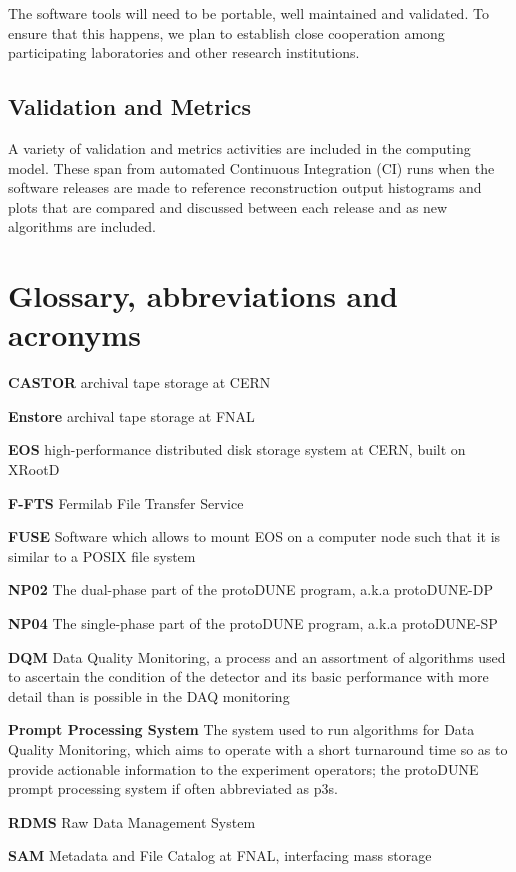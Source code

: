 \documentclass[12pt]{article}
\newcommand{\pd}{protoDUNE\xspace}
\begin{document}
The software tools will need to be portable, well maintained and validated. To ensure that this happens,
we plan to establish close cooperation among participating laboratories and other research institutions.

\subsection{Validation and Metrics}
A variety of validation and metrics activities are included in the computing model. These span from automated Continuous Integration (CI) runs when the software releases are made to reference reconstruction output histograms and plots that are  compared and discussed between each release and as new algorithms are included. 


\newpage
\appendix
\section{Glossary, abbreviations and acronyms}
\label{sec:appendix-glossary}


\begin{description}

\item{\textbf{CASTOR}} archival tape storage at CERN

\item{\textbf{Enstore}} archival tape storage at FNAL

\item{\textbf{EOS}}  high-performance distributed disk storage system at CERN, built on XRootD

\item{\textbf{F-FTS}} Fermilab File Transfer Service

\item{\textbf{FUSE}} Software which allows to mount EOS on a computer node such that it is similar to a POSIX file system

\item{\textbf{NP02}} The dual-phase part of the \pd program, a.k.a \pd-DP

\item{\textbf{NP04}} The single-phase part of the \pd program, a.k.a \pd-SP

\item{\textbf{DQM}} Data Quality Monitoring, a process and an assortment of algorithms used to ascertain
the condition of the detector and its basic performance with more detail than is possible in the DAQ monitoring

\item{\textbf{Prompt Processing System}} The system used to run algorithms for Data Quality Monitoring, which
aims to operate with a short turnaround time so as to provide actionable information to the experiment operators;
the \pd prompt processing system if often abbreviated as p3s.

\item{\textbf{RDMS}} Raw Data Management System

\item{\textbf{SAM}} Metadata and File Catalog at FNAL, interfacing mass storage

\end{description}
\end{document}
